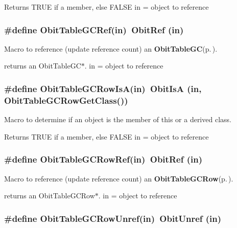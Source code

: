 Returns TRUE if a member, else FALSE in = object to reference 
\subsubsection{\setlength{\rightskip}{0pt plus 5cm}\#define Obit\-Table\-GCRef(in)\ Obit\-Ref (in)}\label{ObitTableGC_8h_a2}


Macro to reference (update reference count) an {\bf Obit\-Table\-GC}{\rm (p.\,\pageref{structObitTableGC})}. 

returns an Obit\-Table\-GC$\ast$. in = object to reference 
\subsubsection{\setlength{\rightskip}{0pt plus 5cm}\#define Obit\-Table\-GCRow\-Is\-A(in)\ Obit\-Is\-A (in, Obit\-Table\-GCRow\-Get\-Class())}\label{ObitTableGC_8h_a6}


Macro to determine if an object is the member of this or a derived class. 

Returns TRUE if a member, else FALSE in = object to reference 
\subsubsection{\setlength{\rightskip}{0pt plus 5cm}\#define Obit\-Table\-GCRow\-Ref(in)\ Obit\-Ref (in)}\label{ObitTableGC_8h_a5}


Macro to reference (update reference count) an {\bf Obit\-Table\-GCRow}{\rm (p.\,\pageref{structObitTableGCRow})}. 

returns an Obit\-Table\-GCRow$\ast$. in = object to reference 
\subsubsection{\setlength{\rightskip}{0pt plus 5cm}\#define Obit\-Table\-GCRow\-Unref(in)\ Obit\-Unref (in)}\label{ObitTableGC_8h_a4}


